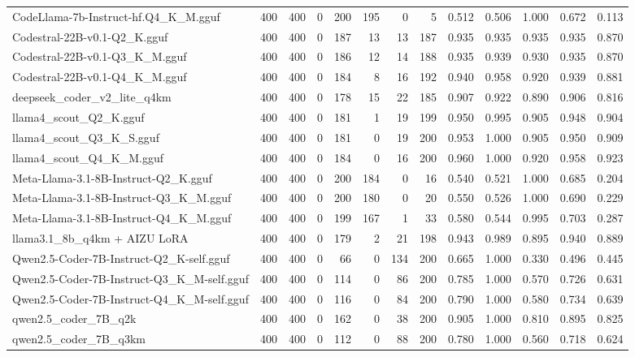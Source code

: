 \begin{table}[htbp]
{\begin{tabular}{lrrrrrrrrrrrr}
    CodeLlama-7b-Instruct-hf.Q4\_K\_M.gguf & 400 & 400 & 0 & 200 & 195 & 0 & 5 & 0.512 & 0.506 & 1.000 & 0.672 & 0.113 \\
    Codestral-22B-v0.1-Q2\_K.gguf & 400 & 400 & 0 & 187 & 13 & 13 & 187 & 0.935 & 0.935 & 0.935 & 0.935 & 0.870 \\
    Codestral-22B-v0.1-Q3\_K\_M.gguf & 400 & 400 & 0 & 186 & 12 & 14 & 188 & 0.935 & 0.939 & 0.930 & 0.935 & 0.870 \\
    Codestral-22B-v0.1-Q4\_K\_M.gguf & 400 & 400 & 0 & 184 & 8 & 16 & 192 & 0.940 & 0.958 & 0.920 & 0.939 & 0.881 \\
    deepseek\_coder\_v2\_lite\_q4km & 400 & 400 & 0 & 178 & 15 & 22 & 185 & 0.907 & 0.922 & 0.890 & 0.906 & 0.816 \\
    llama4\_scout\_Q2\_K.gguf & 400 & 400 & 0 & 181 & 1 & 19 & 199 & 0.950 & 0.995 & 0.905 & 0.948 & 0.904 \\
    llama4\_scout\_Q3\_K\_S.gguf & 400 & 400 & 0 & 181 & 0 & 19 & 200 & 0.953 & 1.000 & 0.905 & 0.950 & 0.909 \\
    llama4\_scout\_Q4\_K\_M.gguf & 400 & 400 & 0 & 184 & 0 & 16 & 200 & 0.960 & 1.000 & 0.920 & 0.958 & 0.923 \\
    Meta-Llama-3.1-8B-Instruct-Q2\_K.gguf & 400 & 400 & 0 & 200 & 184 & 0 & 16 & 0.540 & 0.521 & 1.000 & 0.685 & 0.204 \\
    Meta-Llama-3.1-8B-Instruct-Q3\_K\_M.gguf & 400 & 400 & 0 & 200 & 180 & 0 & 20 & 0.550 & 0.526 & 1.000 & 0.690 & 0.229 \\
    Meta-Llama-3.1-8B-Instruct-Q4\_K\_M.gguf & 400 & 400 & 0 & 199 & 167 & 1 & 33 & 0.580 & 0.544 & 0.995 & 0.703 & 0.287 \\
    llama3.1\_8b\_q4km + AIZU LoRA & 400 & 400 & 0 & 179 & 2 & 21 & 198 & 0.943 & 0.989 & 0.895 & 0.940 & 0.889 \\
    Qwen2.5-Coder-7B-Instruct-Q2\_K-self.gguf & 400 & 400 & 0 & 66 & 0 & 134 & 200 & 0.665 & 1.000 & 0.330 & 0.496 & 0.445 \\
    Qwen2.5-Coder-7B-Instruct-Q3\_K\_M-self.gguf & 400 & 400 & 0 & 114 & 0 & 86 & 200 & 0.785 & 1.000 & 0.570 & 0.726 & 0.631 \\
    Qwen2.5-Coder-7B-Instruct-Q4\_K\_M-self.gguf & 400 & 400 & 0 & 116 & 0 & 84 & 200 & 0.790 & 1.000 & 0.580 & 0.734 & 0.639 \\
    qwen2.5\_coder\_7B\_q2k & 400 & 400 & 0 & 162 & 0 & 38 & 200 & 0.905 & 1.000 & 0.810 & 0.895 & 0.825 \\
    qwen2.5\_coder\_7B\_q3km & 400 & 400 & 0 & 112 & 0 & 88 & 200 & 0.780 & 1.000 & 0.560 & 0.718 & 0.624 \\

\end{tabular}}
\end{table}
